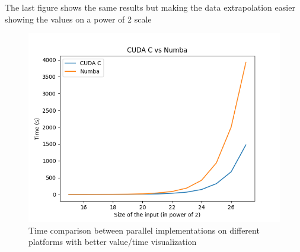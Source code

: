\documentclass[a4paper, 12pt, oneside]{article}
\begin{document}
The last figure shows the same results but making the data extrapolation easier showing the values on a power of 2 scale

\begin{figure}[!h]
  \includegraphics[width=400pt]{images/cpp_vs_py.png}
  \caption{Time comparison between parallel implementations on different platforms with better value/time visualization}
\end{figure}
\end{document}
